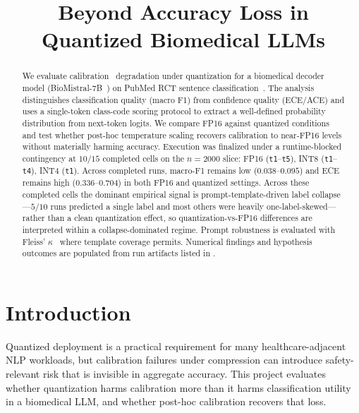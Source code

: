 \documentclass[conference]{IEEEtran}
\begin{document}
\title{Beyond Accuracy Loss in Quantized Biomedical LLMs}

\author{
}

\maketitle

\begin{abstract}
We evaluate calibration~\cite{guo2017} degradation under quantization for a biomedical decoder model (BioMistral-7B~\cite{labrak2024}) on PubMed RCT sentence classification~\cite{dernoncourt2017}.
The analysis distinguishes classification quality (macro F1) from confidence quality (ECE/ACE) and uses a single-token class-code scoring protocol to extract a well-defined probability distribution from next-token logits.
We compare FP16 against quantized conditions and test whether post-hoc temperature scaling recovers calibration to near-FP16 levels without materially harming accuracy.
Execution was finalized under a runtime-blocked contingency at $10/15$ completed cells on the $n=2000$ slice: FP16 (\texttt{t1}--\texttt{t5}), INT8 (\texttt{t1}--\texttt{t4}), INT4 (\texttt{t1}).
Across completed runs, macro-F1 remains low ($0.038$--$0.095$) and ECE remains high ($0.336$--$0.704$) in both FP16 and quantized settings.
Across these completed cells the dominant empirical signal is prompt-template-driven label collapse---$5/10$ runs predicted a single label and most others were heavily one-label-skewed---rather than a clean quantization effect, so quantization-vs-FP16 differences are interpreted within a collapse-dominated regime.
Prompt robustness is evaluated with Fleiss' $\kappa$~\cite{fleiss1971} where template coverage permits.
Numerical findings and hypothesis outcomes are populated from run artifacts listed in .
\end{abstract}

\section{Introduction}

Quantized deployment is a practical requirement for many healthcare-adjacent NLP workloads, but calibration failures under compression can introduce safety-relevant risk that is invisible in aggregate accuracy.
This project evaluates whether quantization harms calibration more than it harms classification utility in a biomedical LLM, and whether post-hoc calibration recovers that loss.
\end{document}
